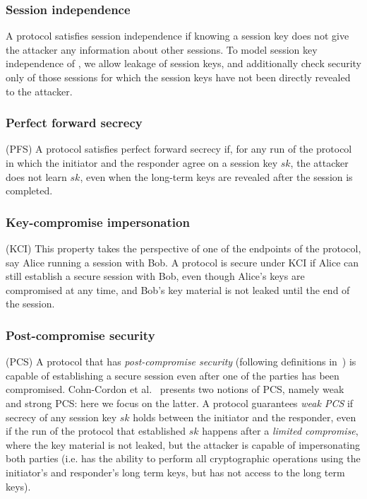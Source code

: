 \subsubsection{Session independence}
A protocol satisfies session independence if knowing a session key does
not give the attacker any information about other sessions.  To model session
key independence of \mEdhoc, we allow leakage of session keys, and additionally
check security only of those sessions for which the session keys have not been
directly revealed to the attacker.

\spacehack
\subsubsection{Perfect forward secrecy} (PFS) A protocol satisfies perfect forward
secrecy if, for any run of the protocol in which the initiator and the responder
agree on a session key $sk$, the attacker does not learn $sk$, even when the
long-term keys are revealed after the session is completed.

\spacehack
\subsubsection{Key-compromise impersonation} (KCI) This property takes the perspective of one
of the endpoints of the protocol, say Alice running a session with Bob. A
protocol is secure under KCI if Alice can still establish a secure session with
Bob, even though Alice's keys are compromised at any time, and Bob's key
material is not leaked until the end of the session.

\spacehack
\subsubsection{Post-compromise security} (PCS) A protocol that has
\emph{post-compromise security} (following definitions in~\cite{cohn2016post})
is capable of establishing a secure session even after one of the parties has
been compromised. Cohn-Cordon et al.~\cite{cohn2016post} presents two notions of
PCS, namely weak and strong PCS: here we focus on the latter.
%
A protocol guarantees \emph{weak PCS} if secrecy of any session key $sk$ holds
between the initiator and the responder, even if the run of the protocol that
established $sk$ happens after a \emph{limited compromise}, where the key
material is not leaked, but the attacker is capable of impersonating both
parties (i.e. has the ability to perform all cryptographic operations using the
initiator's and responder's long term keys, but has not access to the long term
keys).

